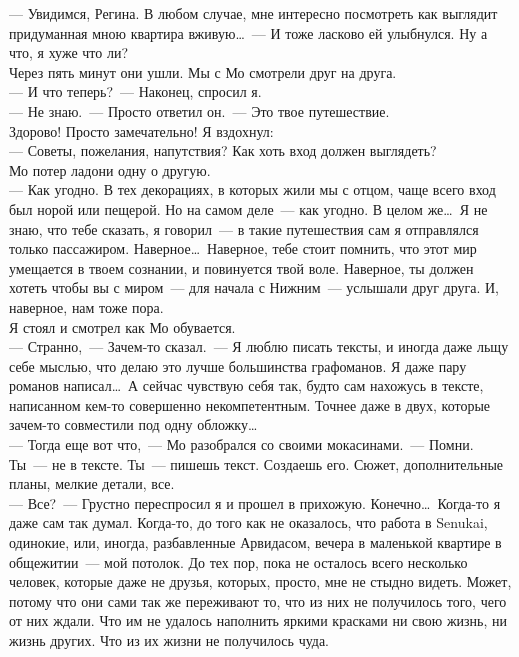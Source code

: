 --- Увидимся, Регина. В любом случае, мне интересно посмотреть как выглядит 
придуманная мною квартира вживую\ldots~--- И тоже ласково ей улыбнулся. Ну а 
что, я хуже что ли?\\
Через пять минут они ушли. Мы с Мо смотрели друг на друга.\\
--- И что теперь?~--- Наконец, спросил я.\\
--- Не знаю.~--- Просто ответил он.~--- Это твое путешествие.\\
Здорово! Просто замечательно! Я вздохнул:\\
--- Советы, пожелания, напутствия? Как хоть вход должен выглядеть?\\
Мо потер ладони одну о другую.\\
--- Как угодно. В тех декорациях, в которых жили мы с отцом, чаще всего вход был 
норой или пещерой. Но на самом деле~--- как угодно. В целом же\ldots\ Я не 
знаю, что тебе сказать, я говорил~--- в такие путешествия сам я отправлялся только 
пассажиром. Наверное\ldots\ Наверное, тебе стоит помнить, что этот мир 
умещается в твоем сознании, и повинуется твой воле. Наверное, ты должен хотеть чтобы вы с 
миром~--- для начала с Нижним~--- услышали друг друга. И, наверное, нам тоже 
пора.\\
Я стоял и смотрел как Мо обувается.\\
--- Странно,~--- Зачем-то сказал.~--- Я люблю писать тексты, и иногда даже льщу 
себе 
мыслью, что делаю это лучше большинства графоманов. Я даже пару романов 
написал\ldots\ А сейчас чувствую себя так, будто сам нахожусь в тексте, 
написанном 
кем-то совершенно некомпетентным. Точнее даже в двух, которые зачем-то 
совместили под одну обложку\ldots\\
--- Тогда еще вот что,~--- Мо разобрался со своими мокасинами.~--- Помни. Ты~--- 
не в тексте. Ты~--- пишешь текст. Создаешь его. Сюжет, дополнительные планы, мелкие 
детали, все.\\
--- Все?~--- Грустно переспросил я и прошел в прихожую. Конечно\ldots\ Когда-то я 
даже сам так думал. Когда-то, до того как не оказалось, что работа в Senukai, 
одинокие, или, иногда, разбавленные Арвидасом, вечера в маленькой квартире в 
общежитии~--- мой потолок. До тех пор, пока не осталось всего несколько 
человек, которые даже не друзья, которых, просто, мне не стыдно видеть. Может, потому 
что они сами так же переживают то, что из них не получилось того, чего от них 
ждали. Что им не удалось наполнить яркими красками ни свою жизнь, ни жизнь других. Что 
из их жизни не получилось чуда.

